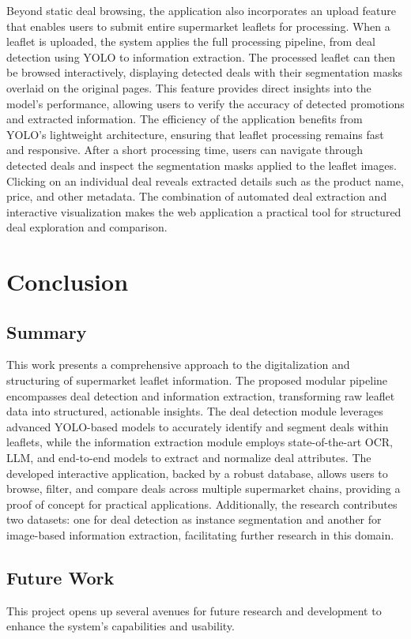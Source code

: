 \documentclass[11pt]{article}
\begin{document}
Beyond static deal browsing, the application also incorporates an upload feature that enables users to submit entire supermarket leaflets for processing. When a leaflet is uploaded, the system applies the full processing pipeline, from deal detection using YOLO to information extraction. The processed leaflet can then be browsed interactively, displaying detected deals with their segmentation masks overlaid on the original pages. This feature provides direct insights into the model’s performance, allowing users to verify the accuracy of detected promotions and extracted information. The efficiency of the application benefits from YOLO’s lightweight architecture, ensuring that leaflet processing remains fast and responsive. After a short processing time, users can navigate through detected deals and inspect the segmentation masks applied to the leaflet images. Clicking on an individual deal reveals extracted details such as the product name, price, and other metadata. The combination of automated deal extraction and interactive visualization makes the web application a practical tool for structured deal exploration and comparison.

\section{Conclusion}
\label{sec:conclusion}
    \subsection{Summary}
    This work presents a comprehensive approach to the digitalization and structuring of supermarket leaflet information. The proposed modular pipeline encompasses deal detection and information extraction, transforming raw leaflet data into structured, actionable insights. The deal detection module leverages advanced YOLO-based models to accurately identify and segment deals within leaflets, while the information extraction module employs state-of-the-art OCR, LLM, and end-to-end models to extract and normalize deal attributes. The developed interactive application, backed by a robust database, allows users to browse, filter, and compare deals across multiple supermarket chains, providing a proof of concept for practical applications. Additionally, the research contributes two datasets: one for deal detection as instance segmentation and another for image-based information extraction, facilitating further research in this domain.

    \subsection{Future Work}
    This project opens up several avenues for future research and development to enhance the system's capabilities and usability.
\end{document}
